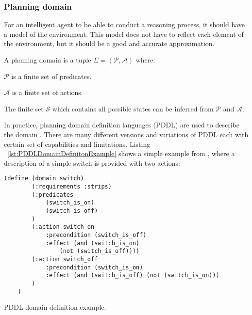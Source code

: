 \subsubsection{Planning domain}

For an intelligent agent to be able to conduct a reasoning process, 
it should have a model of the environment. 
This model does not have to reflect each element of the environment, 
but it should be a good and accurate approximation.
\begin{Tdef}

    A planning domain is a tuple $\Sigma= (\mathcal{P}, \mathcal{A})$ where:
    \vspace{-0.5em}
    \begin{compactitem}
        \item 
        $\mathcal{P}$ is a finite set of predicates.
        \item 
        $\mathcal{A}$ is a finite set of actions.
        \item 
        The finite set $\mathcal{S}$ which contains all possible states can be inferred from $\mathcal{P}$ and $\mathcal{A}$.
    \end{compactitem}
    \vspace{-0.5em}
\end{Tdef}

In practice, planning domain definition languages (PDDL) are used to describe the domain \cite{aeronautiques1998pddl}. There are many different versions and variations of PDDL each with certain set of capabilities and limitations. 
Listing ~\ref{lst:PDDLDomainDefinitonExample} shows a simple example from \cite{IntroductionPlanningDomainhaslum2019}, where a description of a simple switch is provided with two actions:

\begin{Listing}
    \begin{lstlisting}[language=PDDL]
    (define (domain switch)
        (:requirements :strips)
        (:predicates
            (switch_is_on)
            (switch_is_off)
        )
        (:action switch_on
            :precondition (switch_is_off)
            :effect (and (switch_is_on)
                (not (switch_is_off))))
        (:action switch_off
            :precondition (switch_is_on)
            :effect (and (switch_is_off) (not (switch_is_on)))
        )
    )
  \end{lstlisting}
    \caption{PDDL domain definition example.}
    \label{lst:PDDLDomainDefinitonExample}
\end{Listing}

